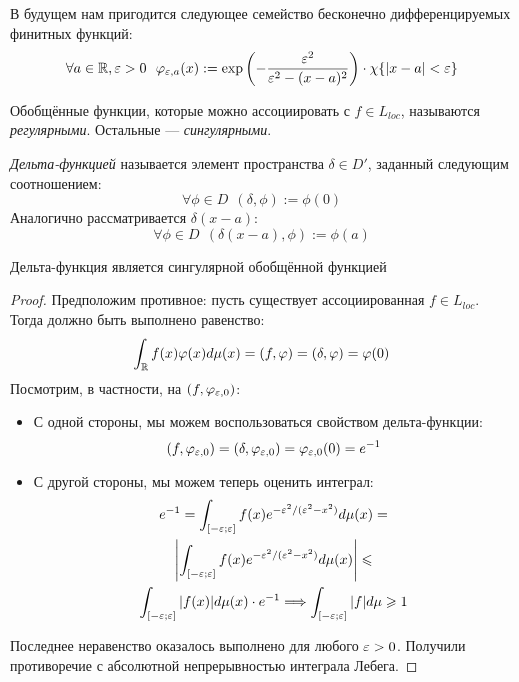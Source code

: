 \begin{example}
	В будущем нам пригодится следующее семейство бесконечно дифференцируемых финитных функций:
	\[
		\forall a \in \mathbb{R}, \varepsilon > 0\ \ \varphi_{\varepsilon, a}(x) := \exp\left(-\frac{\varepsilon^2}{\varepsilon^2 - (x - a)^2}\right) \cdot \chi\{|x - a| < \varepsilon\}
	\]
\end{example}

\begin{definition}
	Обобщённые функции, которые можно ассоциировать с $f \in L_{loc}$, называются \textit{регулярными}. Остальные --- \textit{сингулярными}.
\end{definition}

\begin{definition}
	\textit{Дельта-функцией} называется элемент пространства $\delta \in D'$, заданный следующим соотношением:
	\[
		\forall \phi \in D\ \ (\delta, \phi) := \phi(0)
	\]
	Аналогично рассматривается $\delta(x - a)$:
	\[
		\forall \phi \in D\ \ (\delta(x - a), \phi) := \phi(a)
	\]
\end{definition}

\begin{proposition}
	Дельта-функция является сингулярной обобщённой функцией
\end{proposition}

\begin{proof}
	Предположим противное: пусть существует ассоциированная $f \in L_{loc}$. Тогда должно быть выполнено равенство:
	\[
		\int_{\mathbb{R}} f(x)\varphi(x)d\mu(x) = (f, \varphi) = (\delta, \varphi) = \varphi(0)
	\]
	Посмотрим, в частности, на $(f, \varphi_{\varepsilon, 0})$:
	\begin{itemize}
		\item С одной стороны, мы можем воспользоваться свойством дельта-функции:
		\[
			(f, \varphi_{\varepsilon, 0}) = (\delta, \varphi_{\varepsilon, 0}) = \varphi_{\varepsilon, 0}(0) = e^{-1}
		\]
		
		\item С другой стороны, мы можем теперь оценить интеграл:
		\begin{multline*}
			e^{-1} = \int_{[-\varepsilon; \varepsilon]} f(x)e^{-\varepsilon^2 / (\varepsilon^2 - x^2)}d\mu(x) =
			\\
			\left|\int_{[-\varepsilon; \varepsilon]} f(x)e^{-\varepsilon^2 / (\varepsilon^2 - x^2)}d\mu(x)\right| \leqslant
			\\
			\int_{[-\varepsilon; \varepsilon]} |f(x)|d\mu(x) \cdot e^{-1} \Longrightarrow \int_{[-\varepsilon; \varepsilon]} |f|d\mu \geqslant 1
		\end{multline*}
	\end{itemize}
	Последнее неравенство оказалось выполнено для любого $\varepsilon > 0$. Получили противоречие с абсолютной непрерывностью интеграла Лебега.
\end{proof}

